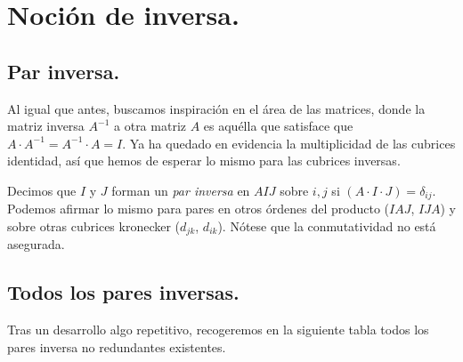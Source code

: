 \documentclass[a4paper, titlepage]{article}
\begin{document}
\newpage

\section{Noción de inversa.}

\subsection{Par inversa.}

Al igual que antes, buscamos inspiración en el área de las matrices, donde la matriz inversa $A^{-1}$ a otra matriz $A$ es aquélla que satisface que ${A\cdot A^{-1} = A^{-1} \cdot A = I}$. Ya ha quedado en evidencia la multiplicidad de las cubrices identidad, así que hemos de esperar lo mismo para las cubrices inversas.

Decimos que $I$ y $J$ forman un \textit{par inversa} en $AIJ$ sobre $i, j$ si $(A\cdot I \cdot J) = \delta_{ij}$. Podemos afirmar lo mismo para pares en otros órdenes del producto ($IAJ$, $IJA$) y sobre otras cubrices kronecker ($d_{jk}$, $d_{ik}$). Nótese que la conmutatividad no está asegurada.

\subsection{Todos los pares inversas.}

Tras un desarrollo algo repetitivo, recogeremos en la siguiente tabla todos los pares inversa no redundantes existentes.

\vspace{0.5cm}
\end{document}

